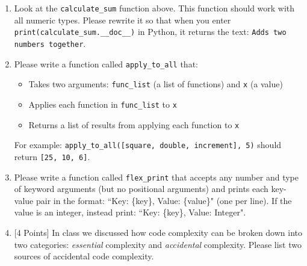 \documentclass[11pt]{article}
\begin{document}
\vspace{1cm}

\begin{enumerate}
    \item Look at the \texttt{calculate\_sum} function above. This function should work with all numeric types. Please rewrite it so that when you enter \texttt{print(calculate\_sum.\_\_doc\_\_)} in Python, it returns the text: \texttt{Adds two numbers together}. 
    
    
    
\vspace{4cm}
    
    \item Please write a function called \texttt{apply\_to\_all} that:
    \begin{itemize}
        \item Takes two arguments: \texttt{func\_list} (a list of functions) and \texttt{x} (a value)
        \item Applies each function in \texttt{func\_list} to \texttt{x}
        \item Returns a list of results from applying each function to \texttt{x}
    \end{itemize}
    
    For example: \texttt{apply\_to\_all([square, double, increment], 5)} should return \texttt{[25, 10, 6]}.
    
\vspace{5.5cm}

    \item Please write a function called \texttt{flex\_print} that accepts any number and type of keyword arguments (but no positional arguments) and prints each key-value pair in the format: ``Key: \{key\}, Value: \{value\}" (one per line). If the value is an integer, instead print: ``Key: \{key\}, Value: Integer".

\vspace{5.5cm}
\item {[4 Points]} In class we discussed how code complexity can be broken down into two categories: {\it essential} complexity and {\it accidental} complexity. Please list two sources of accidental code complexity.
    

\end{enumerate}
\end{document}
